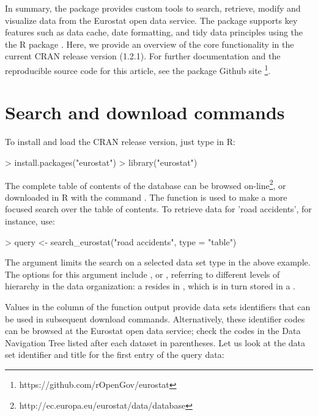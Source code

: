 In summary, the  package provides custom tools to
search, retrieve, modify and visualize data from the Eurostat open
data service. The package supports key features such as data cache,
date formatting, and tidy data principles \citep{wickham2014} using
the the  R package \citep{tidyr}. Here, we provide an
overview of the core functionality in the current CRAN release version
(1.2.1). For further documentation and the reproducible source code
for this article, see the package Github
site \footnote{https://github.com/rOpenGov/eurostat}.


\section{Search and download commands}

To install and load the CRAN release version, just type in R:

\begin{example}
> install.packages("eurostat")
> library("eurostat")
\end{example}

The complete table of contents of the database can be browsed
on-line\footnote{http://ec.europa.eu/eurostat/data/database}, or
downloaded in R with the command . The function  is used
to make a more focused search over the table of contents. To retrieve
data for 'road accidents', for instance, use:

\begin{example}
> query <- search_eurostat("road accidents", type = "table")
\end{example}

The  argument limits the search on a selected data set type
in the above example. The options for this argument
include ,  or , referring to
different levels of hierarchy in the data organization: a 
resides in , which is in turn stored in a
.

Values in the  column of the 
function output provide data sets identifiers that can be used in
subsequent download commands. Alternatively, these identifier codes
can be browsed at the Eurostat open data service; check the codes in
the Data Navigation Tree listed after each dataset in parentheses. Let
us look at the data set identifier and title for the first entry of
the query data:

